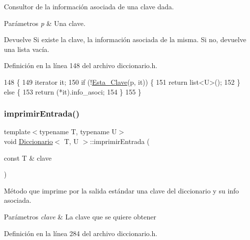 Consultor de la información asociada de una clave dada. 
\begin{DoxyParams}{Parámetros}
{\em p} & Una clave. \\
\hline
\end{DoxyParams}
\begin{DoxyReturn}{Devuelve}
Si existe la clave, la información asociada de la misma. Si no, devuelve una lista vacía. 
\end{DoxyReturn}


Definición en la línea 148 del archivo diccionario.\+h.


\begin{DoxyCode}
148                                      \{
149         iterator it;
150         \textcolor{keywordflow}{if} (!\hyperlink{classDiccionario_a16314351b0600835ade3c7add2ffe040}{Esta\_Clave}(p, it)) \{
151             \textcolor{keywordflow}{return} list<U>();
152         \} \textcolor{keywordflow}{else} \{
153             \textcolor{keywordflow}{return} (*it).info\_asoci;
154         \}
155     \}
\end{DoxyCode}
\mbox{\label{classDiccionario_a62c1870d9b00a467364d8c39a0bda305}} 
\subsubsection{\texorpdfstring{imprimir\+Entrada()}{imprimirEntrada()}}
{\footnotesize\ttfamily template$<$typename T, typename U$>$ \\
void \hyperlink{classDiccionario}{Diccionario}$<$ T, U $>$\+::imprimir\+Entrada (\begin{DoxyParamCaption}\item[{const T \&}]{clave }\end{DoxyParamCaption})\hspace{0.3cm}{\ttfamily [inline]}}



Método que imprime por la salida estándar una clave del diccionario y su info asociada. 


\begin{DoxyParams}{Parámetros}
{\em clave} & La clave que se quiere obtener \\
\hline
\end{DoxyParams}


Definición en la línea 284 del archivo diccionario.\+h.


